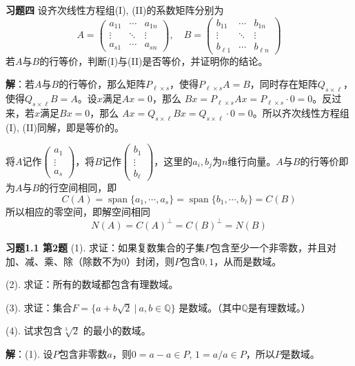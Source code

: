 \vspace{2em}

{\bf 习题四} 设齐次线性方程组(I), (II)的系数矩阵分别为
$$A = \begin{pmatrix} a_{11} & \cdots & a_{1n} \\ \vdots & \ddots & \vdots \\ a_{s1} & \cdots & a_{sn} \end{pmatrix}, \quad B = \begin{pmatrix} b_{11} & \cdots & b_{1n} \\ \vdots & \ddots & \vdots \\ b_{\ell 1} & \cdots & b_{\ell n} \end{pmatrix}$$
若$A$与$B$的行等价，判断(I)与(II)是否等价，并证明你的结论。

{\bf 解}：若$A$与$B$的行等价，那么矩阵$P_{\ell\times s}$，使得$P_{\ell\times s}A = B$，同时存在矩阵$Q_{s\times \ell}$，使得$Q_{s\times \ell}B = A$。设$x$满足$Ax = 0$，那么
$Bx = P_{\ell\times s}Ax = P_{\ell\times s}\cdot 0 = 0$。反过来，若$x$满足$Bx = 0$，那么
$Ax = Q_{s\times \ell}Bx = Q_{s\times \ell}\cdot 0 = 0$。所以齐次线性方程组(I), (II)同解，即是等价的。

将$A$记作$\begin{pmatrix} a_1 \\ \vdots \\ a_s \end{pmatrix}$，将$B$记作$\begin{pmatrix} b_1 \\ \vdots \\ b_{\ell} \end{pmatrix}$，这里的$a_i, b_j$为$n$维行向量。$A$与$B$的行等价即为$A$与$B$的行空间相同，即
$$C(A) = \operatorname{span}\{a_1, \cdots, a_s\} = \operatorname{span}\{b_1, \cdots, b_{\ell}\} = C(B)$$
所以相应的零空间，即解空间相同
$$N(A) = C(A)^{\perp} = C(B)^{\perp} = N(B)$$

\vspace{2em}

{\bf 习题1.1 第2题} (1). 求证：如果复数集合的子集$P$包含至少一个非零数，并且对加、减、乘、除（除数不为$0$）封闭，则$P$包含$0,1$，从而是数域。

(2). 求证：所有的数域都包含有理数域。

(3). 求证：集合$F = \{ a+b\sqrt{2} \ |\ a,b\in\mathbb{Q} \}$ 是数域。（其中$\mathbb{Q}$是有理数域。）

(4). 试求包含$\sqrt[3]{2}$ 的最小的数域。

{\bf 解}：(1). 设$P$包含非零数$a$，则$0 = a-a \in P$, $1 = a/a \in P$，所以$P$是数域。

